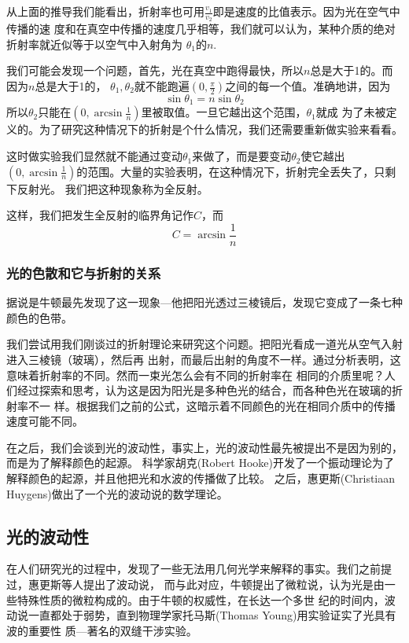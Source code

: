 从上面的推导我们能看出，折射率也可用$\frac{v_1}{v_2}$即是速度的比值表示。因为光在空气中传播的速
度和在真空中传播的速度几乎相等，我们就可以认为，某种介质的绝对折射率就近似等于以空气中入射角为
$\theta_1$的$n$. 

我们可能会发现一个问题，首先，光在真空中跑得最快，所以$n$总是大于1的。而因为$n$总是大于1的，
$\theta_1,\theta_2$就不能跑遍$(0,\frac{\pi}{2})$之间的每一个值。准确地讲，因为
\begin{equation}
\sin{\theta_1} = n\sin{\theta_2}
\end{equation}
所以$\theta_2$只能在$(0,\arcsin{\frac{1}{n}})$里被取值。一旦它越出这个范围，$\theta_1$就成
为了未被定义的。为了研究这种情况下的折射是个什么情况，我们还需要重新做实验来看看。

这时做实验我们显然就不能通过变动$\theta_1$来做了，而是要变动$\theta_2$使它越出
$(0,\arcsin{\frac{1}{n}})$的范围。大量的实验表明，在这种情况下，折射完全丢失了，只剩下反射光。
我们把这种现象称为全反射。

这样，我们把发生全反射的临界角记作$C$，而
\begin{equation}
C = \arcsin{\frac{1}{n}}
\end{equation}

\subsubsection{光的色散和它与折射的关系}
据说是牛顿最先发现了这一现象---他把阳光透过三棱镜后，发现它变成了一条七种颜色的色带。

我们尝试用我们刚谈过的折射理论来研究这个问题。把阳光看成一道光从空气入射进入三棱镜（玻璃），然后再
出射，而最后出射的角度不一样。通过分析表明，这意味着折射率的不同。然而一束光怎么会有不同的折射率在
相同的介质里呢？人们经过探索和思考，认为这是因为阳光是多种色光的结合，而各种色光在玻璃的折射率不一
样。根据我们之前的公式，这暗示着不同颜色的光在相同介质中的传播速度可能不同。

在之后，我们会谈到光的波动性，事实上，光的波动性最先被提出不是因为别的，而是为了解释颜色的起源。
科学家胡克(Robert Hooke)开发了一个振动理论为了解释颜色的起源，并且他把光和水波的传播做了比较。
之后，惠更斯(Christiaan Huygens)做出了一个光的波动说的数学理论。

\subsection{光的波动性}
在人们研究光的过程中，发现了一些无法用几何光学来解释的事实。我们之前提过，惠更斯等人提出了波动说，
而与此对应，牛顿提出了微粒说，认为光是由一些特殊性质的微粒构成的。由于牛顿的权威性，在长达一个多世
纪的时间内，波动说一直都处于弱势，直到物理学家托马斯(Thomas Young)用实验证实了光具有波的重要性
质---著名的双缝干涉实验。

